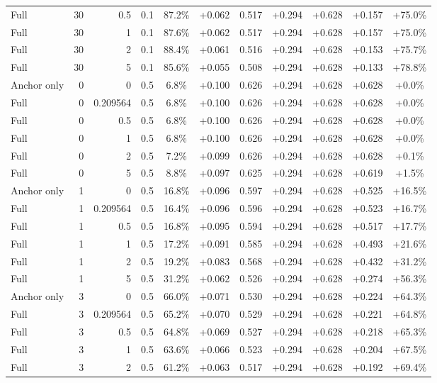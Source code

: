 \begin{table}[htbp]
\begin{tabular}{lrrrccccccc}
Full & 30 & 0.5 & 0.1 & 87.2\% & +0.062 & 0.517 & +0.294 & +0.628 & +0.157 & +75.0\% \\
Full & 30 & 1 & 0.1 & 87.6\% & +0.062 & 0.517 & +0.294 & +0.628 & +0.157 & +75.0\% \\
Full & 30 & 2 & 0.1 & 88.4\% & +0.061 & 0.516 & +0.294 & +0.628 & +0.153 & +75.7\% \\
Full & 30 & 5 & 0.1 & 85.6\% & +0.055 & 0.508 & +0.294 & +0.628 & +0.133 & +78.8\% \\
Anchor only & 0 & 0 & 0.5 & 6.8\% & +0.100 & 0.626 & +0.294 & +0.628 & +0.628 & +0.0\% \\
Full & 0 & 0.209564 & 0.5 & 6.8\% & +0.100 & 0.626 & +0.294 & +0.628 & +0.628 & +0.0\% \\
Full & 0 & 0.5 & 0.5 & 6.8\% & +0.100 & 0.626 & +0.294 & +0.628 & +0.628 & +0.0\% \\
Full & 0 & 1 & 0.5 & 6.8\% & +0.100 & 0.626 & +0.294 & +0.628 & +0.628 & +0.0\% \\
Full & 0 & 2 & 0.5 & 7.2\% & +0.099 & 0.626 & +0.294 & +0.628 & +0.628 & +0.1\% \\
Full & 0 & 5 & 0.5 & 8.8\% & +0.097 & 0.625 & +0.294 & +0.628 & +0.619 & +1.5\% \\
Anchor only & 1 & 0 & 0.5 & 16.8\% & +0.096 & 0.597 & +0.294 & +0.628 & +0.525 & +16.5\% \\
Full & 1 & 0.209564 & 0.5 & 16.4\% & +0.096 & 0.596 & +0.294 & +0.628 & +0.523 & +16.7\% \\
Full & 1 & 0.5 & 0.5 & 16.8\% & +0.095 & 0.594 & +0.294 & +0.628 & +0.517 & +17.7\% \\
Full & 1 & 1 & 0.5 & 17.2\% & +0.091 & 0.585 & +0.294 & +0.628 & +0.493 & +21.6\% \\
Full & 1 & 2 & 0.5 & 19.2\% & +0.083 & 0.568 & +0.294 & +0.628 & +0.432 & +31.2\% \\
Full & 1 & 5 & 0.5 & 31.2\% & +0.062 & 0.526 & +0.294 & +0.628 & +0.274 & +56.3\% \\
Anchor only & 3 & 0 & 0.5 & 66.0\% & +0.071 & 0.530 & +0.294 & +0.628 & +0.224 & +64.3\% \\
Full & 3 & 0.209564 & 0.5 & 65.2\% & +0.070 & 0.529 & +0.294 & +0.628 & +0.221 & +64.8\% \\
Full & 3 & 0.5 & 0.5 & 64.8\% & +0.069 & 0.527 & +0.294 & +0.628 & +0.218 & +65.3\% \\
Full & 3 & 1 & 0.5 & 63.6\% & +0.066 & 0.523 & +0.294 & +0.628 & +0.204 & +67.5\% \\
Full & 3 & 2 & 0.5 & 61.2\% & +0.063 & 0.517 & +0.294 & +0.628 & +0.192 & +69.4\% \\

\end{tabular}
\end{table}
